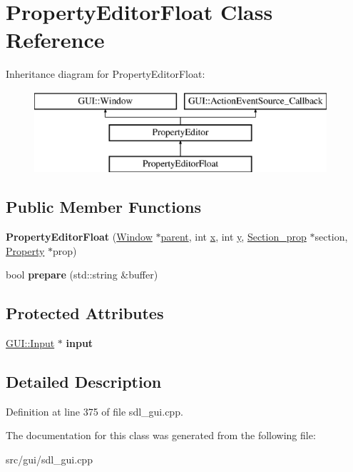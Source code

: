 \hypertarget{classPropertyEditorFloat}{\section{Property\-Editor\-Float Class Reference}
\label{classPropertyEditorFloat}
}
Inheritance diagram for Property\-Editor\-Float\-:\begin{figure}[H]
\begin{center}
\leavevmode
\includegraphics[height=3.000000cm]{classPropertyEditorFloat}
\end{center}
\end{figure}
\subsection*{Public Member Functions}
\begin{DoxyCompactItemize}
\item 
\hypertarget{classPropertyEditorFloat_a802ab5b49e83b39a3bafd825f7423f6f}{{\bfseries Property\-Editor\-Float} (\hyperlink{classGUI_1_1Window_ae828e9daa964dfc65a3550fb03117d30}{Window} $\ast$\hyperlink{classGUI_1_1Window_a2e593ff65e7702178d82fe9010a0b539}{parent}, int \hyperlink{classGUI_1_1Window_a6ca6a80ca00c9e1d8ceea8d3d99a657d}{x}, int \hyperlink{classGUI_1_1Window_a0ee8e923aff2c3661fc2e17656d37adf}{y}, \hyperlink{classSection__prop}{Section\-\_\-prop} $\ast$section, \hyperlink{classProperty}{Property} $\ast$prop)}\label{classPropertyEditorFloat_a802ab5b49e83b39a3bafd825f7423f6f}

\item 
\hypertarget{classPropertyEditorFloat_adbc9db52bdfd97df5ec2f62d3a59db87}{bool {\bfseries prepare} (std\-::string \&buffer)}\label{classPropertyEditorFloat_adbc9db52bdfd97df5ec2f62d3a59db87}

\end{DoxyCompactItemize}
\subsection*{Protected Attributes}
\begin{DoxyCompactItemize}
\item 
\hypertarget{classPropertyEditorFloat_a84a33b96ef3bd08106b7ab4aa8ef7039}{\hyperlink{classGUI_1_1Input}{G\-U\-I\-::\-Input} $\ast$ {\bfseries input}}\label{classPropertyEditorFloat_a84a33b96ef3bd08106b7ab4aa8ef7039}

\end{DoxyCompactItemize}


\subsection{Detailed Description}


Definition at line 375 of file sdl\-\_\-gui.\-cpp.



The documentation for this class was generated from the following file\-:\begin{DoxyCompactItemize}
\item 
src/gui/sdl\-\_\-gui.\-cpp\end{DoxyCompactItemize}
